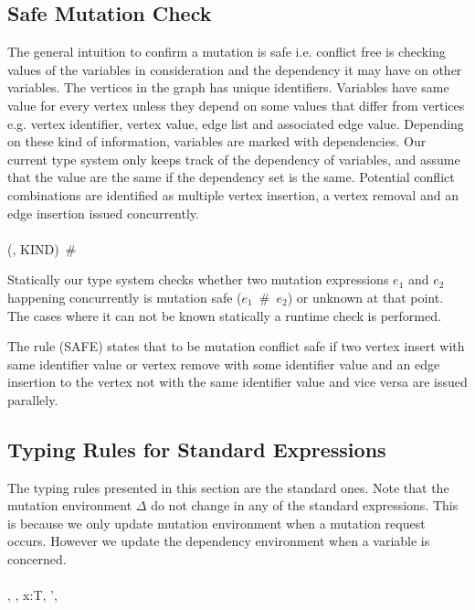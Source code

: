 \subsection{Safe Mutation Check}
\label{subsec:safeMute}

The general intuition to confirm a mutation is safe i.e. conflict free is checking values of the variables in consideration and the dependency it may have on other variables. The vertices in the graph has unique identifiers. Variables have same value for every vertex unless they depend on some values that differ from vertices e.g. vertex identifier, vertex value, edge list and associated edge value. Depending on these kind of information, variables are marked with dependencies. Our current type system only keeps track of the dependency of variables, and assume that the value are the same if the dependency set is the same. Potential conflict combinations are identified as multiple vertex insertion, a vertex removal and an edge insertion issued concurrently.
\ \\
\ \\
    {(\psi , KIND)~\#~\Delta }

\smallskip

Statically our type system checks whether two mutation expressions $e_1$ and $e_2$ happening concurrently is mutation safe ($e_1$~\#~$e_2$) or unknown at that point. The cases where it can not be known statically a runtime check is performed.

The rule (SAFE) states that to be mutation conflict safe if two vertex insert with same identifier value or vertex remove with some identifier value and an edge insertion to the vertex not with the same identifier value and vice versa are issued parallely. 

\subsection{Typing Rules for Standard Expressions}
\label{subsec:standardRules}

The typing rules presented in this section are the standard ones. Note that the mutation environment $\Delta$ do not change in any of the standard expressions. This is because we only update mutation environment when a mutation request occurs. However we update the dependency environment when a variable is concerned. 
\ \\
\ \\
    {\Gamma, \Lambda, \Delta \vdash x:T, \Lambda', \Delta}   

